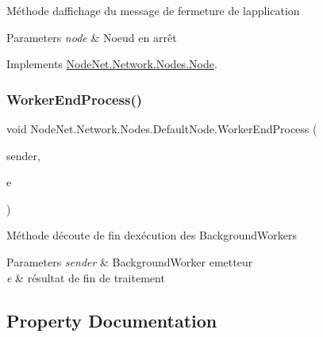 Méthode d\textquotesingle{}affichage du message de fermeture de l\textquotesingle{}application 


\begin{DoxyParams}{Parameters}
{\em node} & Noeud en arrêt\\
\hline
\end{DoxyParams}


Implements \hyperlink{class_node_net_1_1_network_1_1_nodes_1_1_node_a790d3239a1f0f8442450c060c015f9f3}{Node\+Net.\+Network.\+Nodes.\+Node}.

\mbox{\label{class_node_net_1_1_network_1_1_nodes_1_1_default_node_ac5ff229c6de7f4c1035a9d6a7ba3d2ac}} 
\subsubsection{\texorpdfstring{Worker\+End\+Process()}{WorkerEndProcess()}}
{\footnotesize\ttfamily void Node\+Net.\+Network.\+Nodes.\+Default\+Node.\+Worker\+End\+Process (\begin{DoxyParamCaption}\item[{object}]{sender,  }\item[{Run\+Worker\+Completed\+Event\+Args}]{e }\end{DoxyParamCaption})\hspace{0.3cm}{\ttfamily [protected]}}



Méthode d\textquotesingle{}écoute de fin d\textquotesingle{}exécution des Background\+Workers 


\begin{DoxyParams}{Parameters}
{\em sender} & Background\+Worker emetteur\\
\hline
{\em e} & résultat de fin de traitement\\
\hline
\end{DoxyParams}


\subsection{Property Documentation}
\mbox{\label{class_node_net_1_1_network_1_1_nodes_1_1_default_node_a7d3d64c38741aa7ac4a57916abdbe6f9}} 
